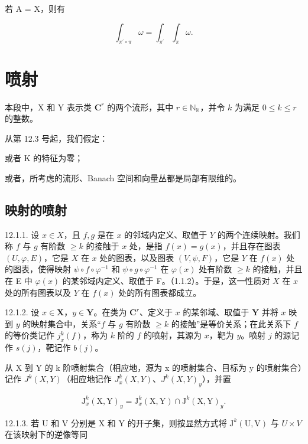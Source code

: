 若 A = X，则有

\[
\int_ {\pi^ {\prime} \circ \pi} \omega = \int_ {\pi^ {\prime}} \int_ {\pi} \omega .
\]

\section{喷射}

本段中，X 和 Y 表示类 \(\mathbf{C}^r\) 的两个流形，其中 \(r \in \mathbb{N}_{\mathbb{K}}\)，并令 \(k\) 为满足 \(0 \leqslant k \leqslant r\) 的整数。

从第 12.3 号起，我们假定：

或者 K 的特征为零；

或者，所考虑的流形、Banach 空间和向量丛都是局部有限维的。

\subsection{映射的喷射}

12.1.1. 设 \(x \in X\)，且 \(f, g\) 是在 \(x\) 的邻域内定义、取值于 \(Y\) 的两个连续映射。我们称 \(f\) 与 \(g\) 有阶数 \(\geqslant k\) 的接触于 \(x\) 处，是指 \(f(x) = g(x)\)，并且存在图表 \((U, \varphi, E)\)，它是 \(X\) 在 \(x\) 处的图表，以及图表 \((V, \psi, F)\)，它是 \(Y\) 在 \(f(x)\) 处的图表，使得映射 \(\psi \circ f \circ \varphi^{-1}\) 和 \(\psi \circ g \circ \varphi^{-1}\) 在 \(\varphi(x)\) 处有阶数 \(\geqslant k\) 的接触，并且在 E 中 \(\varphi(x)\) 的某邻域内定义、取值于 F。（1.1.2）。于是，这一性质对 \(X\) 在 \(x\) 处的所有图表以及 \(Y\) 在 \(f(x)\) 处的所有图表都成立。

12.1.2. 设 \(x \in \mathbf{X}\)，\(y \in \mathbf{Y}\)。在类为 \(\mathbf{C}^r\)、定义于 \(x\) 的某邻域、取值于 \(\mathbf{Y}\) 并将 \(x\) 映到 \(y\) 的映射集合中，关系“\(f\) 与 \(g\) 有阶数 \(\geqslant k\) 的接触”是等价关系；在此关系下 \(f\) 的等价类记作 \(j_x^k(f)\)，称为 \(k\) 阶的 \(f\) 的喷射，其源为 \(x\)，靶为 \(y\)。喷射 \(j\) 的源记作 \(s(j)\)，靶记作 \(b(j)\)。

从 X 到 Y 的 k 阶喷射集合（相应地，源为 x 的喷射集合、目标为 y 的喷射集合）记作 \(J^{k}(X, Y)\)（相应地记作 \(J_{x}^{k}(X, Y)\)、\(J^{k}(X, Y)_{y}\)），并置

\[
\mathrm{J} _ {x} ^ {k} (\mathrm{X}, \mathrm{Y}) _ {y} = \mathrm{J} _ {x} ^ {k} (\mathrm{X}, \mathrm{Y}) \cap \mathrm{J} ^ {k} (\mathrm{X}, \mathrm{Y}) _ {y}.
\]

12.1.3. 若 U 和 V 分别是 X 和 Y 的开子集，则按显然方式将 \(\mathrm{J}^{k}(\mathrm{U},\mathrm{V})\) 与 \(U \times V\) 在该映射下的逆像等同

